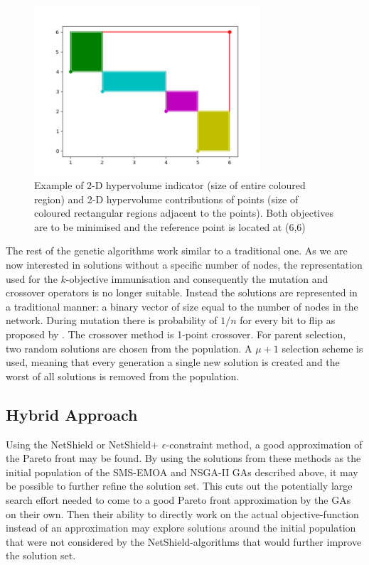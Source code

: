 \documentclass[11pt]{article}
\theoremstyle{definition}
\begin{document}
\begin{figure}[h!]
  \centering
    \includegraphics[width=0.75\textwidth]{other_img/hpc_example_filled}
  \caption{Example of 2-D hypervolume indicator (size of entire coloured region) and 2-D hypervolume contributions of points (size of coloured rectangular regions adjacent to the points). Both objectives are to be minimised and the reference point is located at (6,6)}
  \label{fig:chve}
\end{figure}

The rest of the genetic algorithms work similar to a traditional one. As we are now interested in solutions without a specific number of nodes, the representation used for the $k$-objective immunisation and consequently the mutation and crossover operators is no longer suitable. Instead the solutions are represented in a traditional manner: a binary vector of size equal to the number of nodes in the network. During mutation there is probability of $1/n$ for every bit to flip as proposed by \cite{BackBook}. The crossover method is 1-point crossover. For parent selection, two random solutions are chosen from the population. A $\mu+1$ selection scheme is used, meaning that every generation a single new solution is created and the worst of all solutions is removed from the population.


\subsection{Hybrid Approach}

Using the NetShield or NetShield+ $\epsilon$-constraint method, a good approximation of the Pareto front may be found. By using the solutions from these methods as the initial population of the SMS-EMOA and NSGA-II GAs described above, it may be possible to further refine the solution set. This cuts out the potentially large search effort needed to come to a good Pareto front approximation by the GAs on their own. Then their ability to directly work on the actual objective-function instead of an approximation may explore solutions around the initial population that were not considered by the NetShield-algorithms that would further improve the solution set.
\end{document}
